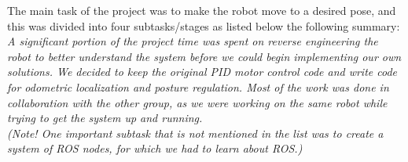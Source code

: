 \documentclass[a4paper,10pt]{article}
\begin{document}
The main task of the project was to make the robot move to a desired pose, and this was divided into four subtasks/stages as listed below the following summary:\\  
\textit{A significant portion of the project time was spent on reverse engineering the robot to better understand the system before we could begin implementing our own solutions.  
We decided to keep the original PID motor control code and write code for odometric localization and posture regulation. 
Most of the work was done in collaboration with the other group, 
as we were working on the same robot while trying to get the system up and running. \\
(Note! One important subtask that is not mentioned in the list was to create a system of ROS nodes, for which we had to learn about ROS.)}
\end{document}

